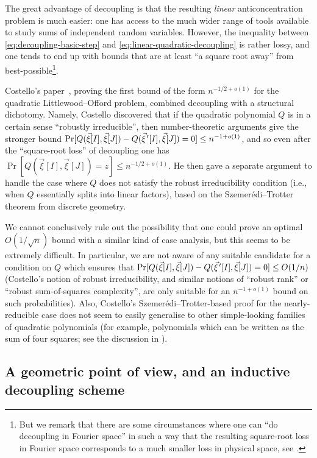 \documentclass[english]{article}
\theoremstyle{remark}
\numberwithin{equation}{section}
\numberwithin{figure}{section}
\newcommand{\pvec}[1]{\vec{#1}\mkern2mu\vphantom{#1}'}
\begin{document}
The great advantage of decoupling is that the resulting \emph{linear} anticoncentration problem is much easier: one has access to the much wider range of tools available to study sums of independent random variables. However, the inequality between \cref{eq:decoupling-basic-step} and \cref{eq:linear-quadratic-decoupling} is rather lossy, and one tends to end up with bounds that are at least ``a square root away'' from best-possible\footnote{But we remark that there are some circumstances where one can ``do decoupling in Fourier space'' in such a way that the resulting square-root loss in Fourier space corresponds to a much smaller loss in physical space, see \cite{FS20,KSSS23}.}.

Costello's paper~\cite{Cos13}, proving the first bound of the form $n^{-1/2+o(1)}$ for the quadratic Littlewood--Offord problem, combined decoupling with a structural dichotomy. Namely, Costello discovered that if the quadratic polynomial $Q$ is in a certain sense ``robustly irreducible'', then number-theoretic arguments give the stronger bound $\Pr[Q(\vec{\xi}[I],\vec{\xi}[J])-Q(\pvec \xi[I],\vec{\xi}[J])=0]\le n^{-1+o(1)}$, and so even after the ``square-root loss'' of decoupling one has $\Pr[Q(\vec{\xi}[I],\vec{\xi}[J])=z]\le n^{-1/2+o(1)}$. He then gave a separate argument to handle the case where $Q$ does not satisfy the robust irreducibility condition (i.e., when $Q$ essentially splits into linear factors), based on the Szemer\'edi--Trotter theorem from discrete geometry.

We cannot conclusively rule out the possibility that one could prove an optimal $O(1/\sqrt n)$ bound with a similar kind of case analysis, but this seems to be extremely difficult. In particular, we are not aware of any suitable candidate for a condition on $Q$ which ensures that $\Pr[Q(\vec{\xi}[I],\vec{\xi}[J])-Q(\pvec \xi[I],\vec{\xi}[J])=0]\le O(1/n)$ (Costello's notion of robust irreducibility, and similar notions of ``robust rank'' or ``robust sum-of-squares complexity'', are only suitable for an $n^{-1+o(1)}$ bound on such probabilities). Also, Costello's Szemer\'edi--Trotter-based proof for the nearly-reducible case does not seem to easily generalise to other simple-looking families of quadratic polynomials (for example, polynomials which can be written as the sum of four squares; see the discussion in \cite[Section~10]{FKS23}).

\subsection{A geometric point of view, and an inductive decoupling scheme}
\label{subsec:decoupling-scheme}
\end{document}
